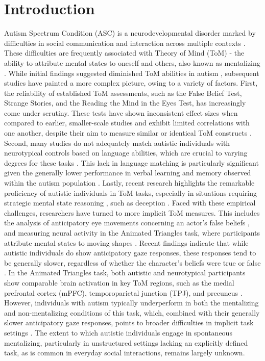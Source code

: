 \thispagestyle{empty}

\newpage

\section*{Introduction}
Autism Spectrum Condition (ASC) is a neurodevelopmental disorder marked by difficulties in social communication and interaction across multiple contexts \citep{apa2013}. These difficulties are frequently associated with Theory of Mind (ToM) - the ability to attribute mental states to oneself and others, also known as mentalizing \citep{premack1978,wimmer1983}. While initial findings suggested diminished ToM abilities in autism \citep{baron-cohen1985,happe1994}, subsequent studies have painted a more complex picture, owing to a variety of factors. 
First, the reliability of established ToM assessments, such as the False Belief Test, Strange Stories, and the Reading the Mind in the Eyes Test, has increasingly come under scrutiny. These tests have shown inconsistent effect sizes when compared to earlier, smaller-scale studies and exhibit limited correlations with one another, despite their aim to measure similar or identical ToM constructs \citep{gernsbacher2019,higgins2024,schaafsma2015,yeung2024}. Second, many studies do not adequately match autistic individuals with neurotypical controls based on language abilities, which are crucial to varying degrees for these tasks \citep{betz2019}. This lack in language matching is particularly significant given the generally lower performance in verbal learning and memory observed within the autism population \citep{velikonja2019}. Lastly, recent research highlights the remarkable proficiency of autistic individuals in ToM tasks, especially in situations requiring strategic mental state reasoning \citep{bowler1992,pantelis2017}, such as deception \citep{vantiel2021}.
Faced with these empirical challenges, researchers have turned to more implicit ToM measures. This includes the analysis of anticipatory eye movements concerning an actor's false beliefs \citep{senju2009}, and measuring neural activity in the Animated Triangles task, where participants attribute mental states to moving shapes \citep{abell2000}. Recent findings indicate that while autistic individuals do show anticipatory gaze responses, these responses tend to be generally slower, regardless of whether the character's beliefs were true or false \citep{glenwright2021,schuwerk2016}. In the Animated Triangles task, both autistic and neurotypical participants show comparable brain activation in key ToM regions, such as the medial prefrontal cortex (mPFC), temporoparietal junction (TPJ), and precuneus \citep{moessnang2020}. However, individuals with autism typically underperform in both the mentalizing and non-mentalizing conditions of this task, which, combined with their generally slower anticipatory gaze responses, points to broader difficulties in implicit task settings \citep{wilson2021}. The extent to which autistic individuals engage in spontaneous mentalizing, particularly in unstructured settings lacking an explicitly defined task, as is common in everyday social interactions, remains largely unknown.
